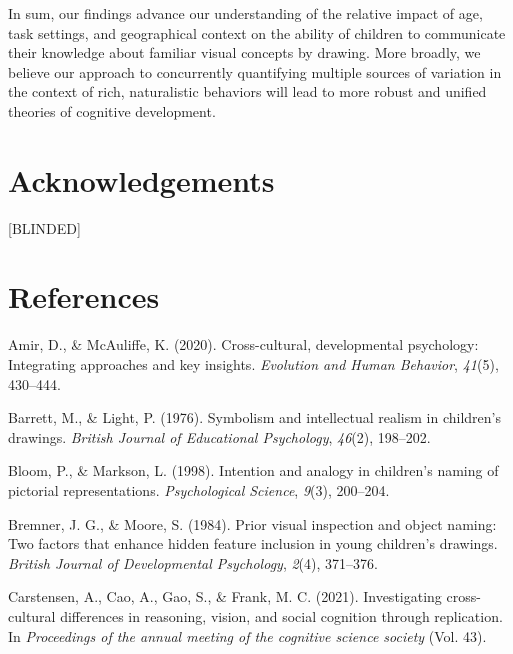 \documentclass[
  english,
  man]{apa6}
\begin{document}
In sum, our findings advance our understanding of the relative impact of age, task settings, and geographical context on the ability of children to communicate their knowledge about familiar visual concepts by drawing. More broadly, we believe our approach to concurrently quantifying multiple sources of variation in the context of rich, naturalistic behaviors will lead to more robust and unified theories of cognitive development.

\hypertarget{acknowledgements}{%
\section{Acknowledgements}\label{acknowledgements}}

{[}BLINDED{]}

\newpage

\hypertarget{references}{%
\section{References}\label{references}}

\begingroup
\setlength{\parindent}{-0.5in}
\setlength{\leftskip}{0.5in}

\endgroup

\hypertarget{refs}{}
\leavevmode\hypertarget{ref-amir2020cross}{}%
Amir, D., \& McAuliffe, K. (2020). Cross-cultural, developmental psychology: Integrating approaches and key insights. \emph{Evolution and Human Behavior}, \emph{41}(5), 430--444.

\leavevmode\hypertarget{ref-barrett1976symbolism}{}%
Barrett, M., \& Light, P. (1976). Symbolism and intellectual realism in children's drawings. \emph{British Journal of Educational Psychology}, \emph{46}(2), 198--202.

\leavevmode\hypertarget{ref-bloom1998intention}{}%
Bloom, P., \& Markson, L. (1998). Intention and analogy in children's naming of pictorial representations. \emph{Psychological Science}, \emph{9}(3), 200--204.

\leavevmode\hypertarget{ref-bremmer1984prior}{}%
Bremner, J. G., \& Moore, S. (1984). Prior visual inspection and object naming: Two factors that enhance hidden feature inclusion in young children's drawings. \emph{British Journal of Developmental Psychology}, \emph{2}(4), 371--376.

\leavevmode\hypertarget{ref-carstensen2021investigating}{}%
Carstensen, A., Cao, A., Gao, S., \& Frank, M. C. (2021). Investigating cross-cultural differences in reasoning, vision, and social cognition through replication. In \emph{Proceedings of the annual meeting of the cognitive science society} (Vol. 43).
\end{document}
